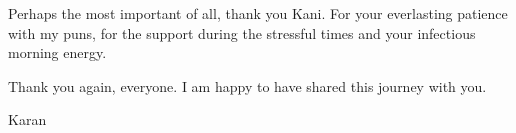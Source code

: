 Perhaps the most important of all, thank you Kani. For your everlasting patience with my puns, for the support during the stressful times and your infectious morning energy.

Thank you again, everyone. I am happy to have shared this journey with you.

Karan


\cleardoublepage

